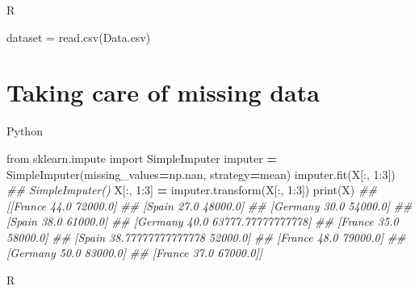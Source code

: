\documentclass[
]{book}
\newenvironment{Shaded}{\begin{snugshade}}{\end{snugshade}}
\newcommand{\BuiltInTok}[1]{#1}
\newcommand{\CommentTok}[1]{\textcolor[rgb]{0.56,0.35,0.01}{\textit{#1}}}
\newcommand{\DecValTok}[1]{\textcolor[rgb]{0.00,0.00,0.81}{#1}}
\newcommand{\FunctionTok}[1]{\textcolor[rgb]{0.00,0.00,0.00}{#1}}
\newcommand{\ImportTok}[1]{#1}
\newcommand{\NormalTok}[1]{#1}
\newcommand{\OperatorTok}[1]{\textcolor[rgb]{0.81,0.36,0.00}{\textbf{#1}}}
\newcommand{\OtherTok}[1]{\textcolor[rgb]{0.56,0.35,0.01}{#1}}
\newcommand{\StringTok}[1]{\textcolor[rgb]{0.31,0.60,0.02}{#1}}
\theoremstyle{definition}
\theoremstyle{definition}
\theoremstyle{definition}
\theoremstyle{definition}
\theoremstyle{remark}
\begin{document}
R

\begin{Shaded}
\begin{Highlighting}[]
\NormalTok{dataset }\OtherTok{=} \FunctionTok{read.csv}\NormalTok{(}\StringTok{\textquotesingle{}Data.csv\textquotesingle{}}\NormalTok{)}
\end{Highlighting}
\end{Shaded}

\hypertarget{taking-care-of-missing-data}{%
\section{Taking care of missing data}\label{taking-care-of-missing-data}}

Python

\begin{Shaded}
\begin{Highlighting}[]
\ImportTok{from}\NormalTok{ sklearn.impute }\ImportTok{import}\NormalTok{ SimpleImputer}
\NormalTok{imputer }\OperatorTok{=}\NormalTok{ SimpleImputer(missing\_values}\OperatorTok{=}\NormalTok{np.nan, strategy}\OperatorTok{=}\StringTok{\textquotesingle{}mean\textquotesingle{}}\NormalTok{)}
\NormalTok{imputer.fit(X[:, }\DecValTok{1}\NormalTok{:}\DecValTok{3}\NormalTok{])}
\CommentTok{\#\# SimpleImputer()}
\NormalTok{X[:, }\DecValTok{1}\NormalTok{:}\DecValTok{3}\NormalTok{] }\OperatorTok{=}\NormalTok{ imputer.transform(X[:, }\DecValTok{1}\NormalTok{:}\DecValTok{3}\NormalTok{])}
\BuiltInTok{print}\NormalTok{(X)}
\CommentTok{\#\# [[\textquotesingle{}France\textquotesingle{} 44.0 72000.0]}
\CommentTok{\#\#  [\textquotesingle{}Spain\textquotesingle{} 27.0 48000.0]}
\CommentTok{\#\#  [\textquotesingle{}Germany\textquotesingle{} 30.0 54000.0]}
\CommentTok{\#\#  [\textquotesingle{}Spain\textquotesingle{} 38.0 61000.0]}
\CommentTok{\#\#  [\textquotesingle{}Germany\textquotesingle{} 40.0 63777.77777777778]}
\CommentTok{\#\#  [\textquotesingle{}France\textquotesingle{} 35.0 58000.0]}
\CommentTok{\#\#  [\textquotesingle{}Spain\textquotesingle{} 38.77777777777778 52000.0]}
\CommentTok{\#\#  [\textquotesingle{}France\textquotesingle{} 48.0 79000.0]}
\CommentTok{\#\#  [\textquotesingle{}Germany\textquotesingle{} 50.0 83000.0]}
\CommentTok{\#\#  [\textquotesingle{}France\textquotesingle{} 37.0 67000.0]]}
\end{Highlighting}
\end{Shaded}

R
\end{document}
